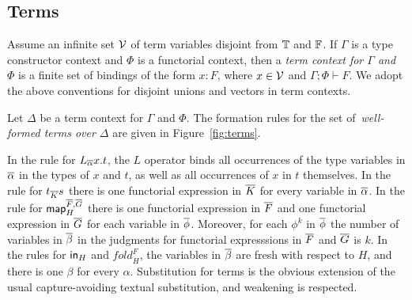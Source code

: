 \documentclass[runningheads]{llncs}
\newcommand{\map}{\mathsf{map}}
\newcommand{\fold}{\mathit{fold}}
\begin{document}
\vspace*{-0.1in}

\subsection{Terms}\label{sec:terms}
Assume an infinite set $\cal V$ of term variables disjoint from
$\mathbb{T}$ and $\mathbb{F}$. If $\Gamma$ is a type constructor context and
$\Phi$ is a functorial context, then a {\em term context for $\Gamma$
  and $\Phi$} is a finite set of bindings of the form $x : F$, where
$x \in {\cal V}$ and $\Gamma; \Phi \vdash F$. We adopt the above
conventions for disjoint unions and vectors in term contexts.

Let $\Delta$ be a term context for $\Gamma$ and $\Phi$.  The formation
rules for the set of\, {\em well-formed terms over $\Delta$} are given
in Figure~\ref{fig:terms}.

In the rule for $L_{\overline{\alpha}}x.t$, the $L$ operator binds all
occurrences of the type variables in $\overline{\alpha}$ in the types of $x$
and $t$, as well as all occurrences of $x$ in $t$ themselves. In the
rule for $t_{\overline{K}} s$ there is one functorial expression in $\overline{K}$
for every variable in $\overline{\alpha}$. In the rule for
$\map^{\ol{F},\ol{G}}_H$ there is one functorial expression in $\overline{F}$
and one functorial expression in $\overline{G}$ for each variable in
$\overline{\phi}$. Moreover, for each $\phi^k$ in $\overline{\phi}$ the number of
variables in $\overline{\beta}$ in the judgments for functorial expresssions
in $\overline{F}$ and $\overline{G}$ is $k$. In the rules for $\mathsf{in}_H$ and
$\fold^F_H$, the variables in $\overline{\beta}$ are fresh with respect to
$H$, and there is one $\beta$ for every $\alpha$.
Substitution for terms is the obvious extension of the usual
capture-avoiding textual substitution, and weakening is respected.
\end{document}
